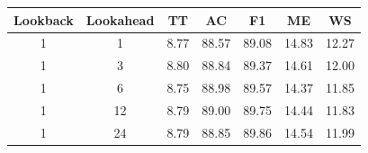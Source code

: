 \newpage
\begin{table}[H]
	\centering
	\begin{tabular}{|c|c||c|c|c|c|c|}
		\hline
		\textbf{Lookback} & \textbf{Lookahead} & \textbf{TT} & \textbf{AC} & \textbf{F1} & \textbf{ME} & \textbf{WS} \\
		\hline \hline
		 1 &  1 & 8.77 & 88.57 & 89.08 & 14.83 & 12.27 \\
		\hline
		 1 &  3 & 8.80 & 88.84 & 89.37 & 14.61 & 12.00 \\
		\hline
		 1 &  6 & 8.75 & 88.98 & 89.57 & 14.37 & 11.85 \\
		\hline
		 1 & 12 & 8.79 & 89.00 & 89.75 & 14.44 & 11.83 \\
		\hline
		 1 & 24 & 8.79 & 88.85 & 89.86 & 14.54 & 11.99 \\

\end{tabular}
\end{table}
